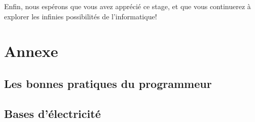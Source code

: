 \documentclass[12pt,a4paper,oneside]{report}
\begin{document}
Enfin, nous espérons que vous avez apprécié ce stage, et que vous continuerez à explorer les infinies possibilités de l'informatique!


\chapter{Annexe}

\section{Les bonnes pratiques du programmeur}


\section{Bases d'électricité}



\end{document}
